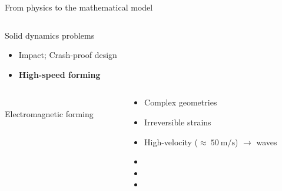 \begin{withoutheadline}
  \begin{frame}{From physics to the mathematical model}
  \vspace{-0.6cm}
  \begin{overprint}
    
    \begin{columns}
      \begin{column}{0.45\textwidth}
        \begin{block}{Solid dynamics problems}
          \begin{itemize}
          \item[] Impact; Crash-proof design
          \item[] \textbf{High-speed forming}
          \end{itemize}
        \end{block}
      \end{column}
      
      \begin{column}{0.55\textwidth}
      \end{column}
    \end{columns}

    
    \begin{columns}
      \begin{column}{0.45\textwidth}
        \centering
        \\
    \scriptsize Electromagnetic forming \cite{Guillaume}
      \end{column}
      \begin{column}{0.45\textwidth}
        \begin{block}{}
          \begin{footnotesize}
            \begin{itemize}
            \item Complex geometries
            \item Irreversible strains
            \item High-velocity ($\approx \: 50\:\text{m/s}$) $\rightarrow$ waves
            \item[]
            \item[]
            \item[]
            \end{itemize}
          \end{footnotesize}
        \end{block}  
      \end{column}
    \end{columns}
    

\end{overprint}
\end{frame}
\end{withoutheadline}
